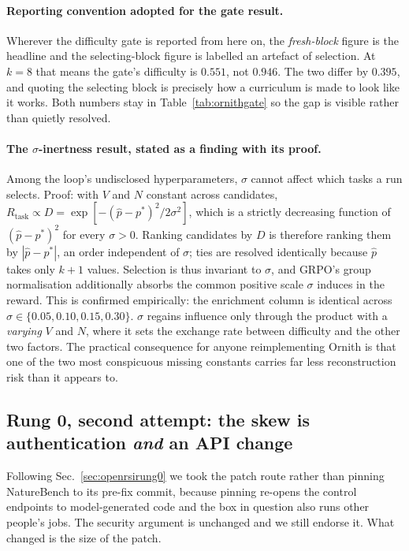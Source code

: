 \paragraph{Reporting convention adopted for the gate result.} Wherever the difficulty gate
is reported from here on, the \emph{fresh-block} figure is the headline and the
selecting-block figure is labelled an artefact of selection. At $k=8$ that means the gate's
difficulty is $0.551$, not $0.946$. The two differ by $0.395$, and quoting the selecting
block is precisely how a curriculum is made to look like it works. Both numbers stay in
Table~\ref{tab:ornithgate} so the gap is visible rather than quietly resolved.

\paragraph{The $\sigma$-inertness result, stated as a finding with its proof.} Among the
loop's undisclosed hyperparameters, $\sigma$ cannot affect which tasks a run selects.
Proof: with $V$ and $N$ constant across candidates,
$R_{\mathrm{task}} \propto D = \exp[-(\hat p-p^*)^2/2\sigma^2]$, which is a strictly
decreasing function of $(\hat p-p^*)^2$ for every $\sigma>0$. Ranking candidates by $D$ is
therefore ranking them by $|\hat p-p^*|$, an order independent of $\sigma$; ties are
resolved identically because $\hat p$ takes only $k+1$ values. Selection is thus invariant
to $\sigma$, and GRPO's group normalisation additionally absorbs the common positive scale
$\sigma$ induces in the reward. This is confirmed empirically: the enrichment column is
identical across $\sigma\in\{0.05,0.10,0.15,0.30\}$. $\sigma$ regains influence only
through the product with a \emph{varying} $V$ and $N$, where it sets the exchange rate
between difficulty and the other two factors. The practical consequence for anyone
reimplementing Ornith is that one of the two most conspicuous missing constants carries far
less reconstruction risk than it appears to.

\subsection{Rung 0, second attempt: the skew is authentication \emph{and} an API change}
\label{sec:openrsirung0b}

Following Sec.~\ref{sec:openrsirung0} we took the patch route rather than pinning
NatureBench to its pre-fix commit, because pinning re-opens the control endpoints to
model-generated code and the box in question also runs other people's jobs. The security
argument is unchanged and we still endorse it. What changed is the size of the patch.

